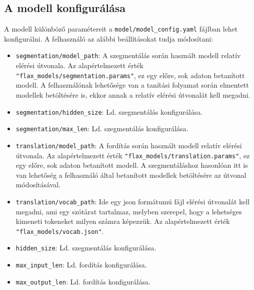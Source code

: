 \subsection{A modell konfigurálása}
A modell különböző paramétereit a \texttt{model/model\_config.yaml} fájlban
lehet konfigurálni. A felhasználó az alábbi beállításokat tudja módosítani:
\begin{itemize}
    \item \texttt{segmentation/model\_path}: A szegmentálás során használt
        modell relatív elérési útvonala. Az alapértelmezett érték
        \texttt{"flax\_models/segmentation.params"}, ez egy előre, sok adaton
        betanított modell. A felhasználónak lehetősége van a tanítási folyamat
        során elmentett modellek betöltésére is, ekkor annak a relatív elérési
        útvonalát kell megadni.
    \item \texttt{segmentation/hidden\_size}: Ld. szegmentálás konfigurálása.
    \item \texttt{segmentation/max\_len}: Ld. szegmentálás konfigurálása.
    \item \texttt{translation/model\_path}: A fordítás során használt modell
        relatív elérési útvonala. Az alapértelmezett érték
        \texttt{"flax\_models/translation.params"}, ez egy előre, sok adaton
        betanított modell. A szegmentáláshoz hasonlóan itt is van lehetőség
        a felhasználó által betanított modellek betöltésére az útvonal
        módosításával.
    \item \texttt{translation/vocab\_path}: Ide egy json formátumú fájl elérési
        útvonalát kell megadni, ami egy szótárat tartalmaz, melyben szerepel,
        hogy a lehetséges kimeneti tokeneket milyen számra képezzük. Az
        alapértelmezett érték \texttt{"flax\_models/vocab.json"}.
    \item \texttt{hidden\_size}: Ld. szegmentálás konfigurálása.
    \item \texttt{max\_input\_len}: Ld. fordítás konfigurálása.
    \item \texttt{max\_output\_len}: Ld. fordítás konfigurálása.
\end{itemize}

